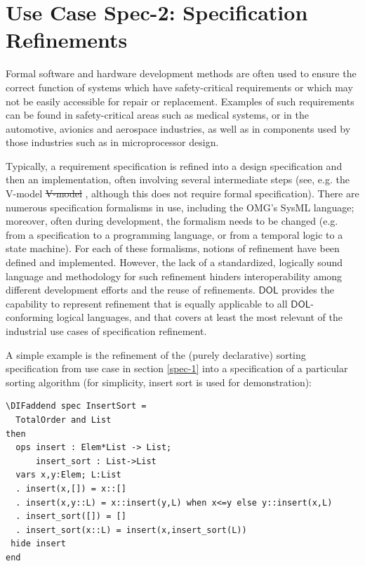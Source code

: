 \documentclass[10pt,fleqn,final]{scrreprt}
\newcommand*{\DOL}{\ensuremath{\mathsf{DOL}}\xspace}
\newenvironment{definitions}[0]{\medskip }{}
\providecommand{\DIFadd}[1]{{\protect\color{blue}\uwave{#1}}} %
\providecommand{\DIFdel}[1]{{\protect\color{red}\sout{#1}}}                      %
\providecommand{\DIFaddbegin}{} %
\providecommand{\DIFaddend}{} %
\providecommand{\DIFdelbegin}{} %
\providecommand{\DIFdelend}{} %
\begin{document}
\begin{definitions}
\section{Use Case Spec-2: Specification Refinements}\label{spec-2}
Formal software and hardware development methods are often used to
ensure the correct function of systems which have safety-critical
requirements or which may not be easily accessible for repair or
replacement.  Examples of such requirements can be found in
safety-critical areas such as medical systems, or in the automotive,
avionics and aerospace industries, as well as in components used by
those industries such as in microprocessor design.

Typically, a requirement specification is refined into a
design specification and then an implementation, often involving
several intermediate steps (see, e.g. the V-model\DIFdelbegin %
\DIFdel{V-model}%
\DIFdelend \DIFaddbegin \DIFadd{~\mbox{%
\cite{V-model}
}%
}\DIFaddend , although
this does not require formal specification).  There are numerous
specification formalisms in use, including the OMG's SysML language;
moreover, often during development, the formalism needs to be changed
(e.g. from a specification to a programming language, or from a
temporal logic to a state machine). For each of these formalisms,
notions of refinement have been defined and implemented. However, the
lack of a standardized, logically sound language and methodology for
such refinement hinders interoperability among different development
efforts and the reuse of refinements.  \DOL provides the capability to
represent refinement that is equally applicable to all \DOL-conforming
logical languages, and that covers at least the most relevant of the
industrial use cases of specification refinement.

A simple example is the refinement of the (purely declarative) sorting
specification from use case in section \ref{spec-1} into a specification of a particular sorting
algorithm (for simplicity, insert sort is used for demonstration):

\DIFdelbegin %
\DIFdelend \DIFaddbegin \begin{lstlisting}[basicstyle=\ttfamily\footnotesize,language=dolText,alsolanguage=CASL,escapechar=@,mathescape]	
\DIFaddend spec InsertSort = 
  TotalOrder and List
then
  ops insert : Elem*List -> List;
      insert_sort : List->List
  vars x,y:Elem; L:List
  . insert(x,[]) = x::[]
  . insert(x,y::L) = x::insert(y,L) when x<=y else y::insert(x,L)
  . insert_sort([]) = []
  . insert_sort(x::L) = insert(x,insert_sort(L))
 hide insert
end


\end{lstlisting}
\end{definitions}
\end{document}
